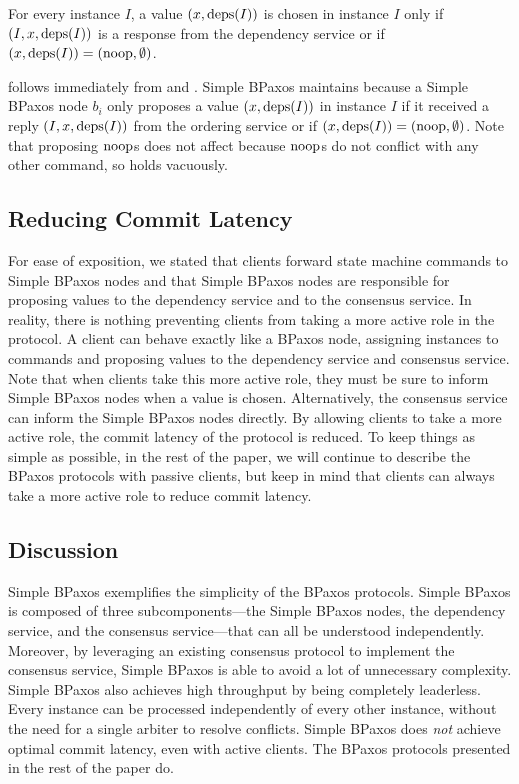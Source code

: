 \begin{invariant}
  For every instance $I$, a value $(x, \text{deps}(I))$ is chosen in instance $I$
  only if $(I, x, \text{deps}(I))$ is a response from the dependency service or if
  $(x, \text{deps}(I)) = (\text{noop}, \emptyset)$.
\end{invariant}

 follows immediately from 
and .  Simple BPaxos maintains
 because a Simple BPaxos node $b_i$ only proposes
a value $(x, \text{deps}(I))$ in instance $I$ if it received a reply $(I, x,
\text{deps}(I))$ from the ordering service or if $(x, \text{deps}(I)) = (\text{noop},
\emptyset)$. Note that proposing $\text{noop}{}$s does not affect
 because $\text{noop}$s do not conflict with any other
command, so  holds vacuously.

\subsection{Reducing Commit Latency}
For ease of exposition, we stated that clients forward state machine commands
to Simple BPaxos nodes and that Simple BPaxos nodes are responsible for
proposing values to the dependency service and to the consensus service. In
reality, there is nothing preventing clients from taking a more active role in
the protocol. A client can behave exactly like a BPaxos node, assigning
instances to commands and proposing values to the dependency service and
consensus service. Note that when clients take this more active role, they must
be sure to inform Simple BPaxos nodes when a value is chosen.  Alternatively,
the consensus service can inform the Simple BPaxos nodes directly.
%
By allowing clients to take a more active role, the commit latency of the
protocol is reduced. To keep things as simple as possible, in the rest of the
paper, we will continue to describe the BPaxos protocols with passive clients,
but keep in mind that clients can always take a more active role to reduce
commit latency.

\subsection{Discussion}
Simple BPaxos exemplifies the simplicity of the BPaxos protocols. Simple BPaxos
is composed of three subcomponents---the Simple BPaxos nodes, the dependency
service, and the consensus service---that can all be understood independently.
Moreover, by leveraging an existing consensus protocol to implement the
consensus service, Simple BPaxos is able to avoid a lot of unnecessary
complexity.
%
Simple BPaxos also achieves high throughput by being completely leaderless.
Every instance can be processed independently of every other instance, without
the need for a single arbiter to resolve conflicts.
%
Simple BPaxos does \emph{not} achieve optimal commit latency, even with active
clients. The BPaxos protocols presented in the rest of the paper do.
